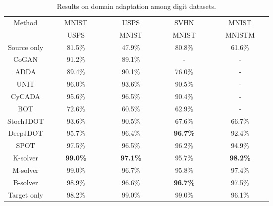 \documentclass[runningheads]{llncs}
\begin{document}
\begin{table}[!t]
	\centering
	\vspace{-10pt}
    \caption{Results on domain adaptation among digit datasets.} 
	\vspace{5pt}
	\begin{tabular}{c|c|c|c|c}
		\hline 
		\multirow{2}{*}{Method} & ~~~~MNIST~~~~ & ~~~~USPS~~~~ & ~~~~SVHN~~~~ & ~~~~MNIST~~~~ \\ 
		                       & USPS & MNIST & MNIST & MNISTM \\
		\hline		
		
		\rule{0pt}{2.0ex}
		Source only & 81.5\% & 47.9\% & 80.8\% & 61.6\% \\
		\hline
		
 		\rule{0pt}{2.0ex}
 		CoGAN \cite{cogan} & 91.2\% & 89.1\% & - & - \\
 		\hline

 		\rule{0pt}{2.0ex}
 		ADDA \cite{adda} & 89.4\% & 90.1\% & 76.0\% & - \\
 		\hline

 		\rule{0pt}{2.0ex}
 		UNIT \cite{unit} & 96.0\% & 93.6\% & 90.5\% & - \\
 		\hline

 		\rule{0pt}{2.0ex}
 		CyCADA \cite{cycada} & 95.6\% & 96.5\% & 90.4\% & - \\
 		\hline

		\rule{0pt}{2.0ex}
		BOT \cite{large-scale} & 72.6\% & 60.5\% & 62.9\% & - \\
		\hline
		
		\rule{0pt}{2.0ex}
		StochJDOT \cite{stochjdot} & 93.6\% & 90.5\% & 67.6\% & 66.7\% \\
		\hline
		
		\rule{0pt}{2.0ex}
		DeepJDOT \cite{deepjdot} & 95.7\% & 96.4\% & \bf{96.7\%} & 92.4\% \\
		\hline
		
		\rule{0pt}{2.0ex}
		SPOT \cite{spot} & 97.5\% & 96.5\% & 96.2\% & 94.9\% \\
		\hline
		
		\rule{0pt}{2.0ex}
		K-solver & \bf{99.0\%} & \bf{97.1\%} & {95.7}\% & \bf{98.2\%} \\
		\hline

		\rule{0pt}{2.0ex}
		M-solver & {99.0\%} & {96.7\%} & {95.8}\% & {97.4\%} \\
		\hline

		\rule{0pt}{2.0ex}
		B-solver & {98.9\%} & {96.6\%} & \bf{96.7}\% & {97.5\%} \\
		\hline

		\rule{0pt}{2.0ex}
		Target only & 98.2\% & 99.0\% & 99.0\% & 96.1\% \\
		\hline
	\end{tabular}
	\label{domain_adaptation_table}
	\vspace{-10pt}
\end{table}
\end{document}
